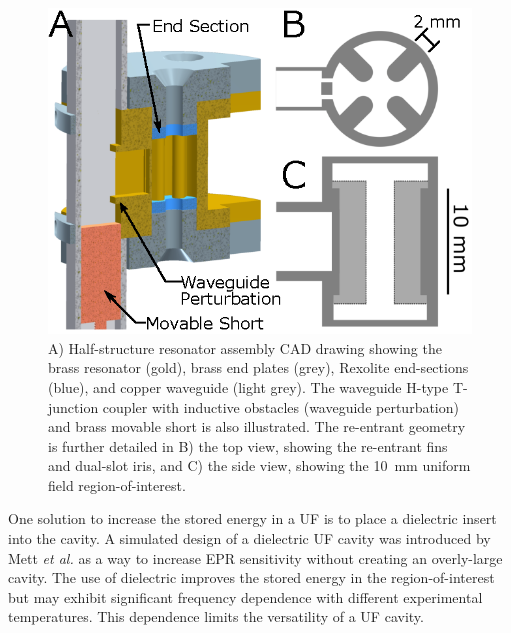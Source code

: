 \begin{figure}[htb]\centering
 \includegraphics{Kapitel/Ch2-Images/01-TE01UGeometry.eps}
 \caption[Resonator Assembly CAD Drawing.]{A) Half-structure resonator assembly CAD drawing showing the brass resonator (gold), brass end plates (grey), Rexolite end-sections (blue), and copper waveguide (light grey). The waveguide H-type T-junction coupler with inductive obstacles (waveguide perturbation) and brass movable short is also illustrated. The re-entrant geometry is further detailed in B) the top view, showing the re-entrant fins and dual-slot iris, and C) the side view, showing the 10~mm uniform field region-of-interest.}
 \label{Ch2-fig:GEO}
\end{figure}

One solution to increase the stored energy in a UF \cylTE{} is to place a dielectric insert into the cavity. A simulated design of a dielectric UF cavity was introduced by Mett \textit{et al.} as a way to increase EPR sensitivity without creating an overly-large cavity. \cite{HydeUFDR2017} The use of dielectric improves the stored energy in the region-of-interest but may exhibit significant frequency dependence with different experimental temperatures. \cite{Hartnett2003} This dependence limits the versatility of a UF cavity. 

